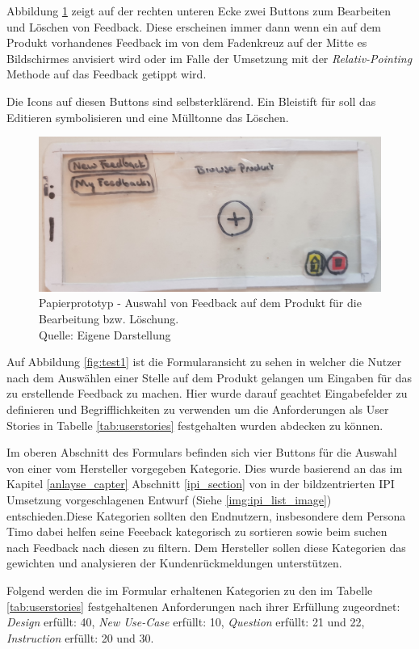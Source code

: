 Abbildung \ref{img:ppeditdelete} zeigt auf der rechten unteren Ecke zwei Buttons zum Bearbeiten und Löschen von Feedback. Diese erscheinen immer dann wenn ein auf dem Produkt vorhandenes Feedback 
im von dem Fadenkreuz auf der Mitte es Bildschirmes anvisiert wird oder im Falle der Umsetzung mit der \textit{Relativ-Pointing} Methode auf das Feedback getippt wird. 

Die Icons auf diesen Buttons sind selbsterklärend. Ein Bleistift für soll das Editieren symbolisieren und eine Mülltonne das Löschen.

\begin{figure}[H]
	\centering
	\includegraphics[width=.7\textwidth]{resources/conception/lowfi_edit_delete.jpg}
	\caption{Papierprototyp - Auswahl von Feedback auf dem Produkt für die Bearbeitung bzw. Löschung. \\Quelle: Eigene Darstellung}
	\label{img:ppeditdelete}
\end{figure}

Auf Abbildung \ref{fig:test1} ist die Formularansicht zu sehen in welcher die Nutzer nach dem Auswählen einer Stelle auf dem Produkt gelangen um Eingaben für das zu erstellende Feedback zu machen. 
Hier wurde darauf geachtet Eingabefelder zu definieren und Begrifflichkeiten zu verwenden um die Anforderungen als User Stories in Tabelle \ref{tab:userstories} festgehalten wurden abdecken zu können.

Im oberen Abschnitt des Formulars befinden sich vier Buttons für die Auswahl von einer vom Hersteller vorgegeben Kategorie. 
Dies wurde basierend an das im Kapitel \ref{anlayse_capter} Abschnitt \ref{ipi_section} von \citeauthor{Kirschner2012} in der bildzentrierten IPI Umsetzung vorgeschlagenen Entwurf (Siehe \ref{img:ipi_list_image}) entschieden.Diese Kategorien sollten den Endnutzern, insbesondere dem Persona Timo dabei helfen seine Feeeback kategorisch zu sortieren sowie beim suchen nach Feedback nach diesen zu filtern. 
Dem Hersteller sollen diese Kategorien das gewichten und analysieren der Kundenrückmeldungen unterstützen. 

Folgend werden die im Formular erhaltenen Kategorien zu den im Tabelle \ref{tab:userstories} festgehaltenen Anforderungen nach ihrer Erfüllung zugeordnet: \textit{Design} erfüllt: 40, \textit{New Use-Case} erfüllt: 10, \textit{Question} erfüllt: 21 und 22, \textit{Instruction} erfüllt: 20 und 30.

